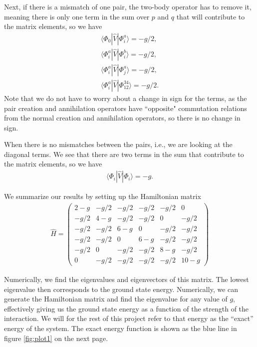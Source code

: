 \documentclass[a4paper, 11pt, notitlepage, english]{article}
\newcommand{\op}[1]{\hat{#1}}
\newcommand{\braopket}[3]{\langle #1 | {#2} | #3 \rangle}
\begin{document}
Next, if there is a mismatch of one pair, the two-body operator has to remove it, meaning there is only one term in the sum over $p$ and $q$ that will contribute to the matrix elements, so we have
\begin{align*}
\braopket{\Phi_0}{\op{V}}{\Phi_i^a} = -g/2, \\
\braopket{\Phi_i^a}{\op{V}}{\Phi_i^{b}} = -g/2, \\
\braopket{\Phi_i^a}{\op{V}}{\Phi_j^{a}} = -g/2, \\
\braopket{\Phi_i^a}{\op{V}}{\Phi_{12}^{34}} = -g/2.
\end{align*}
Note that we do not have to worry about a change in sign for the terms, as the pair creation and annihilation operators have ``opposite" commutation relations from the normal creation and annihilation operators, so there is no change in sign.

When there is no mismatches between the pairs, i.e., we are looking at the diagonal terms. We see that there are two terms in the sum that contribute to the matrix elements, so we have
\begin{align*}
\braopket{\Phi_i}{\op{V}}{\Phi_i} = -g.
\end{align*}

We summarize our results by setting up the Hamiltonian matrix
\begin{align*}
\op{H} = \begin{pmatrix}
2 - g &  -g/2 & -g/2  & -g/2  & -g/2  & 0     \\
-g/2  & 4 - g & -g/2  & -g/2  & 0     & -g/2  \\
-g/2  & -g/2  & 6 - g &	0     & -g/2  & -g/2  \\              
-g/2  & -g/2  & 0     & 6 - g &	-g/2  & -g/2  \\                         
-g/2  &	0	  & -g/2  & -g/2  & 8 - g & -g/2  \\
0     &  -g/2 & -g/2  & -g/2  &  -g/2 & 10 - g 
\end{pmatrix}
\end{align*}

Numerically, we find the eigenvalues and eigenvectors of this matrix. The lowest eigenvalue then corresponds to the ground state energy. Numerically, we can generate the Hamiltonian matrix and find the eigenvalue for any value of $g$, effectively giving us the ground state energy as a function of the strength of the interaction. We will for the rest of this project refer to that energy as the ``exact'' energy of the system. The exact energy function is shown as the blue line in figure \ref{fig:plot1} on the next page.
\end{document}
